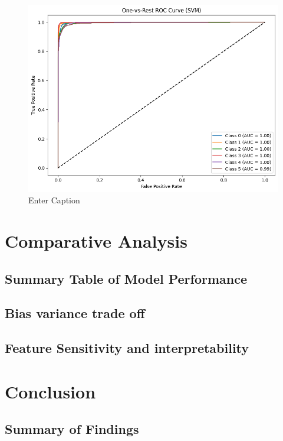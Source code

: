\documentclass[10pt,twocolumn]{article}
\begin{document}
\begin{figure}[H]
    \centering
    \includegraphics[width=1\linewidth]{images/svm/svm-poly-roc.png}
    \caption{Enter Caption}
    \label{fig:svm-roc-poly}
\end{figure}


\clearpage
\section{Comparative Analysis}


\subsection{Summary Table of Model Performance}

\subsection{Bias variance trade off}

\subsection{Feature Sensitivity and interpretability}


\section{Conclusion}


\subsection{Summary of Findings}
\end{document}
